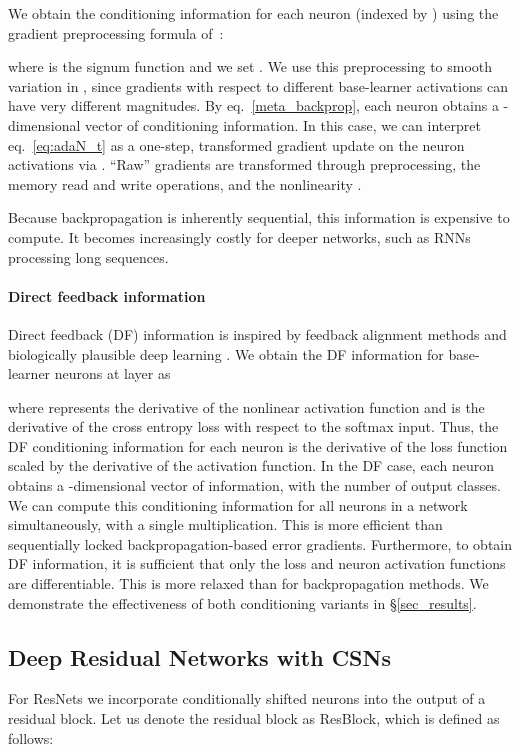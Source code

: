 \documentclass{article}
\begin{document}
We obtain the conditioning information  for each neuron (indexed by ) using the gradient preprocessing formula of~\citet{andrychowicz2016learning}:

where  is the signum function and we set .
We use this preprocessing to smooth variation in , since gradients with respect to different base-learner activations can have very different magnitudes.
By eq.~\ref{meta_backprop}, each neuron obtains a -dimensional vector of conditioning information. In this case, we can interpret eq.~\ref{eq:adaN_t} as a one-step, transformed gradient update on the neuron activations via . ``Raw'' gradients are transformed through preprocessing, the memory read and write operations, and the nonlinearity .

Because backpropagation is inherently sequential, this information is expensive to compute. It becomes increasingly costly for deeper networks, such as RNNs processing long sequences.

\paragraph{Direct feedback information}
Direct feedback (DF) information is inspired by feedback alignment methods \cite{lillicrap2016random,nokland2016direct} and biologically plausible deep learning \cite{bengio2015towards}. We obtain the DF information for base-learner neurons at layer  as

where   represents the derivative of the nonlinear activation function  and  is the derivative of the cross entropy loss with respect to the softmax input. Thus, the DF conditioning information for each neuron is the derivative of the loss function scaled by the derivative of the activation function.
In the DF case, each neuron obtains a -dimensional vector of information, with  the number of output classes.
We can compute this conditioning information for all neurons in a network simultaneously, with a single multiplication. This is more efficient than sequentially locked backpropagation-based error gradients. Furthermore, to obtain DF information, it is sufficient that only the loss and neuron activation functions are differentiable. This is more relaxed than for backpropagation methods. We demonstrate the effectiveness of both conditioning variants in \S\ref{sec_results}.


\subsection{Deep Residual Networks with CSNs}
\label{ada_resnet}
For ResNets \cite{he2016deep} we incorporate conditionally shifted neurons into the output of a residual block. Let us denote the residual block as ResBlock, which is defined as follows:
\end{document}

